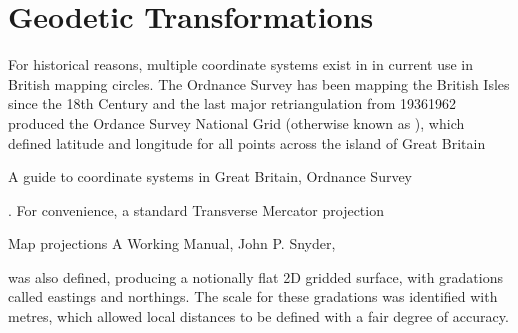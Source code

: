 \documentclass[letterpaper,10pt,english]{sphinxmanual}
\begin{document}
\chapter{Geodetic Transformations}
\label{\detokenize{index:geodetic-transformations}}
\sphinxAtStartPar
For historical reasons, multiple coordinate systems exist in in current use in
British mapping circles. The Ordnance Survey has been mapping the British Isles
since the 18th Century and the last major retriangulation from 1936\sphinxhyphen{}1962 produced
the Ordance Survey National Grid (otherwise known as ), which defined
latitude and longitude for all points across the island of Great Britain %
\begin{footnote}[1]\sphinxAtStartFootnote
A guide to coordinate systems in Great Britain, Ordnance Survey
%
\end{footnote}.
For convenience, a standard Transverse Mercator projection %
\begin{footnote}[2]\sphinxAtStartFootnote
Map projections \sphinxhyphen{} A Working Manual, John P. Snyder, 
%
\end{footnote} was also defined,
producing a notionally flat 2D gridded surface, with gradations called eastings
and northings. The scale for these gradations was identified with metres, which
allowed local distances to be defined with a fair degree of accuracy.
\end{document}
